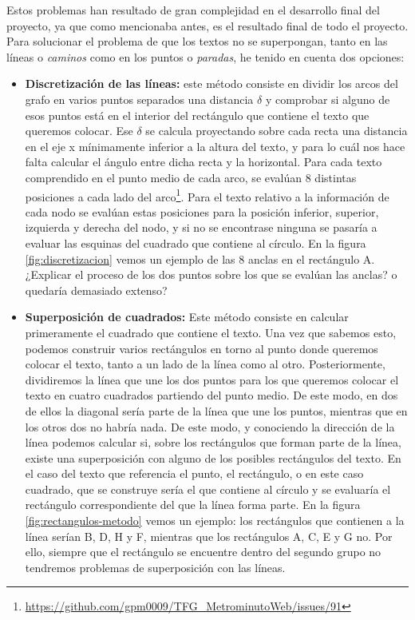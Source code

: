 Estos problemas han resultado de gran complejidad en el desarrollo final del proyecto, ya que como mencionaba antes, es el resultado final de todo el proyecto. Para solucionar el problema de que los textos no se superpongan, tanto en las líneas o \textit{caminos} como en los puntos o \textit{paradas}, he tenido en cuenta dos opciones:
\begin{itemize}
	\item \textbf{Discretización de las líneas:} este método consiste en dividir los arcos del grafo en varios puntos separados una distancia $\delta$ y comprobar si alguno de esos puntos está en el interior del rectángulo que contiene el texto que queremos colocar. Ese $\delta$ se calcula proyectando sobre cada recta una distancia en el eje x mínimamente inferior a la altura del texto, y para lo cuál nos hace falta calcular el ángulo entre dicha recta y la horizontal. Para cada texto comprendido en el punto medio de cada arco, se evalúan 8 distintas posiciones a cada lado del arco\footnote{\url{https://github.com/gpm0009/TFG_MetrominutoWeb/issues/91}}. Para el texto relativo a la información de cada nodo se evalúan estas posiciones para la posición inferior, superior, izquierda y derecha del nodo, y si no se encontrase ninguna se pasaría a evaluar las esquinas del cuadrado que contiene al círculo. En la figura \ref{fig:discretizacion} vemos un ejemplo de las 8 anclas en el rectángulo A. ¿Explicar el proceso de los dos puntos sobre los que se evalúan las anclas? o quedaría demasiado extenso?
	
	\item \textbf{Superposición de cuadrados:} Este método consiste en calcular primeramente el cuadrado que contiene el texto. Una vez que sabemos esto, podemos construir varios rectángulos en torno al punto donde queremos colocar el texto, tanto a un lado de la línea como al otro. Posteriormente, dividiremos la línea que une los dos puntos para los que queremos colocar el texto en cuatro cuadrados partiendo del punto medio. De este modo, en dos de ellos la diagonal sería parte de la línea que une los puntos, mientras que en los otros dos no habría nada. De este modo, y conociendo la dirección de la línea podemos calcular si, sobre los rectángulos que forman parte de la línea, existe una superposición con alguno de los posibles rectángulos del texto. En el caso del texto que referencia el punto, el rectángulo, o en este caso cuadrado, que se construye sería el que contiene al círculo y se evaluaría el rectángulo correspondiente del que la línea forma parte. En la figura \ref{fig:rectangulos-metodo} vemos un ejemplo: los rectángulos que contienen a la línea serían B, D, H y F, mientras que los rectángulos A, C, E y G no. Por ello, siempre que el rectángulo se encuentre dentro del segundo grupo no tendremos problemas de superposición con las líneas.
\end{itemize}
